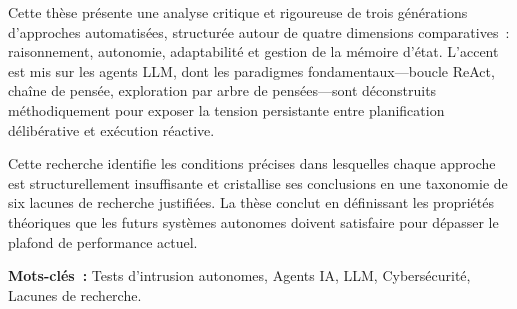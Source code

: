 \documentclass[12pt,a4paper,oneside,openany]{book}
\begin{document}
Cette th{\`e}se pr{\'e}sente une analyse critique et rigoureuse de trois g{\'e}n{\'e}rations d'approches automatis{\'e}es, structur{\'e}e autour de quatre dimensions comparatives~: raisonnement, autonomie, adaptabilit{\'e} et gestion de la m{\'e}moire d'\'etat. L'accent est mis sur les agents LLM, dont les paradigmes fondamentaux---boucle ReAct, cha{\^i}ne de pens{\'e}e, exploration par arbre de pens{\'e}es---sont d{\'e}construits m{\'e}thodiquement pour exposer la tension persistante entre planification d{\'e}lib{\'e}rative et ex{\'e}cution r{\'e}active.

Cette recherche identifie les conditions pr{\'e}cises dans lesquelles chaque approche est structurellement insuffisante et cristallise ses conclusions en une taxonomie de six lacunes de recherche justifi{\'e}es. La th{\`e}se conclut en d{\'e}finissant les propri{\'e}t{\'e}s th{\'e}oriques que les futurs syst{\`e}mes autonomes doivent satisfaire pour d{\'e}passer le plafond de performance actuel.

\noindent\textbf{Mots-cl{\'e}s~:} Tests d'intrusion autonomes, Agents IA, LLM, Cybers{\'e}curit{\'e}, Lacunes de recherche.
\tableofcontents
\listoftables
{}

\end{document}
